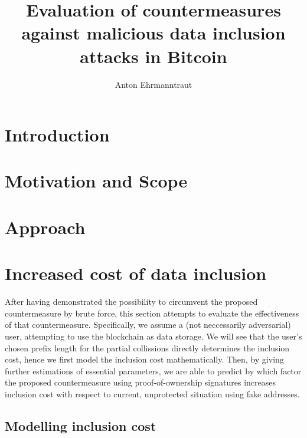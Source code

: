 \documentclass[10pt,a4paper,twocolumn]{article}
\title{Evaluation of countermeasures against malicious data inclusion attacks in Bitcoin}
\author{Anton Ehrmanntraut}
\renewenvironment{abstract}
{\begin{quote}
\noindent {\bfseries \abstractname.}}
{\end{quote}
}
\begin{document}
\raggedbottom
\maketitle
\begin{abstract}
\end{abstract}

\section{Introduction}

\section{Motivation and Scope}



\section{Approach}

\section{Increased cost of data inclusion}

After having demonstrated the possibility to circumvent the proposed countermeasure by brute force, this section attempts to evaluate the effectiveness of that countermeasure. 
Specifically, we assume a (not neccessarily adversarial) user, attempting to use the blockchain as data storage.
We will see that the user's chosen prefix length for the partial collissions directly determines the inclusion cost, hence we first model the inclusion cost mathematically. Then, by giving further estimations of essential parameters, we are able to predict by which factor the proposed countermeasure using proof-of-ownership signatures increases inclusion cost with respect to current, unprotected situation using fake addresses. 

\subsection{Modelling inclusion cost}
\end{document}

